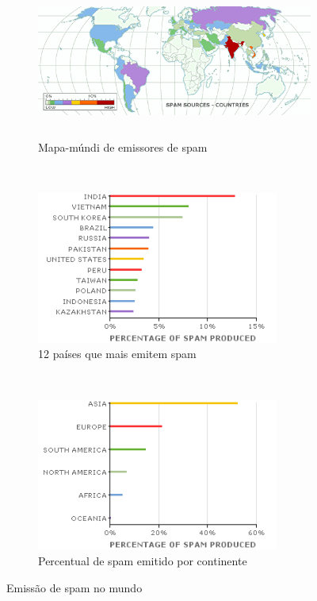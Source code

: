 \documentclass[a4paper,dvipdfm]{article}
\begin{document}
	\begin{figure}[ht]
		\begin{subfigure}[b]{\textwidth}
			\centering
			\includegraphics[height=5cm]{Imagens/m86security/spam-country-map.png}
			\caption{Mapa-múndi de emissores de spam}
		\end{subfigure}
		~
		\begin{subfigure}[b]{0.47\textwidth}
			\centering
			\includegraphics[height=5cm]{Imagens/m86security/spam-country-bar.png}
			\caption{12 países que mais emitem spam}
		\end{subfigure}
		~
		\begin{subfigure}[b]{0.47\textwidth}
			\centering
			\includegraphics[height=5cm]{Imagens/m86security/spam-continent-bar.png}
			\caption{Percentual de spam emitido por continente}
		\end{subfigure}
		\caption{Emissão de spam no mundo}
		\label{fig:spamworld}
	\end{figure}
		~
\end{document}
